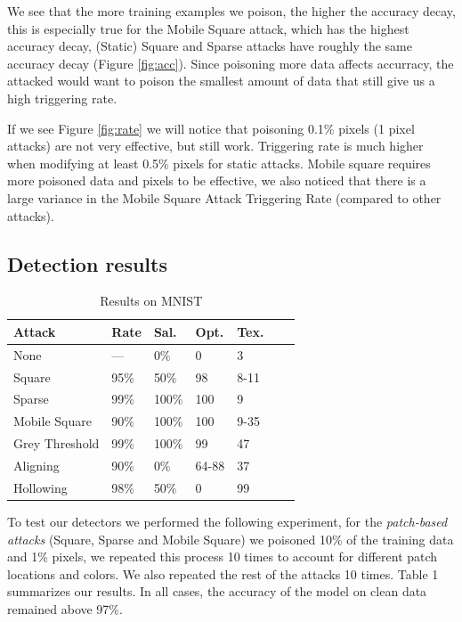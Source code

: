 \documentclass[letterpaper, 10 pt, conference]{ieeeconf}  %
\begin{document}
We see that the more training examples we poison, the higher the accuracy decay, this is
especially true for the Mobile Square attack, which has the highest accuracy
decay, (Static) Square and Sparse attacks have roughly the same accuracy
decay (Figure \ref{fig:acc}). Since poisoning more data affects accurracy, the attacked would want to poison
the smallest amount of data that still give us a high triggering rate.

If we see Figure \ref{fig:rate} we will notice that poisoning 0.1\% pixels
(1 pixel attacks) are not very effective, but still work. Triggering
rate is much higher when modifying at least 0.5\% pixels for static attacks.
Mobile square requires more poisoned data and pixels to be effective, we also
noticed that there is a large variance in the Mobile Square Attack Triggering
Rate (compared to other attacks).


\subsection{Detection results}

\begin{table}
\begin{center}
  \begin{tabular}{lllllll}
    \hline
    Attack & Rate & Sal. & Opt. & Tex.\\
    \hline
    None & ---  & 0\% & 0 & 3\\
    Square  & 95\% & 50\% & 98 & 8-11\\
    Sparse  & 99\% & 100\% & 100 & 9\\
    Mobile Square & 90\% & 100\% & 100 & 9-35\\
    Grey Threshold & 99\% & 100\% & 99 & 47\\
    Aligning  & 90\% & 0\% & 64-88 & 37\\
    Hollowing & 98\% & 50\% & 0 & 99\\
    \hline
  \end{tabular}
  \caption{Results on MNIST}
  \end{center}
\end{table}

To test our detectors we performed the following experiment, for the
\textit{patch-based attacks} (Square, Sparse and Mobile Square) we poisoned
10\% of the training data and 1\% pixels, we repeated this process 10 times
to account for different patch locations and colors. We also repeated the rest
of the attacks 10 times. Table 1 summarizes our results.  In all
cases, the accuracy of the model on clean data remained above 97\%.
\end{document}

